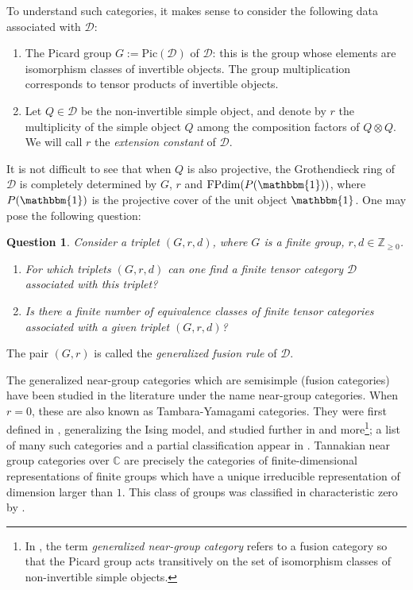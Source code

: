\documentclass{amsart}
\theoremstyle{plain}%
\newtheorem*{introquestion*}{Question}
\theoremstyle{remark}
\newcommand{\1}{\mathbbm{1}}
\newcommand{\D}{\mathcal{D}}
\newcommand{\Z}{\mathbb{Z}}
\newcommand{\FPdim}{\mathrm{FPdim}}
\newcommand{\pic}{\mathrm{Pic}}
\begin{document}
    To understand such categories, it makes sense to consider the following data associated with $\D$:
    \begin{enumerate}
        \item The Picard group $G:=\pic(\D)$ of $\D$: this is the group whose elements are isomorphism classes of invertible objects. The group multiplication corresponds to tensor products of invertible objects.
        \item Let $Q\in \D$ be the non-invertible simple  object, and denote by $r$ the multiplicity of the simple object $Q$ among the composition factors of $Q\otimes Q$. We will call $r$ the {\it extension constant} of $\D$.
    \end{enumerate}
    It is not difficult to see that when $Q$ is also projective, the Grothendieck ring of $\D$ is completely determined by $G$, $r$ and $\FPdim(P(\1))$, where $P(\1)$ is the projective cover of the unit object $\1$. One may pose the following question: 
    \begin{introquestion*}\label{ques:main}
        Consider a triplet $(G,r,d)$, where $G$ is a finite group, $r,d\in \Z_{\geq 0}$.
        \begin{enumerate}
            \item For which triplets $(G,r,d)$ can one find a finite tensor category $\D$ associated with this triplet? 
            \item Is there a finite number of equivalence classes of finite tensor categories associated with a given triplet $(G,r,d)$?
        \end{enumerate}
    \end{introquestion*}
The pair $(G, r)$ is called the {\it generalized fusion rule} of $\D$.

    The generalized near-group categories which are semisimple (fusion categories) have been studied in the literature under the name near-group categories. When $r=0$, these are also known as Tambara-Yamagami categories. They were first defined in \cite{TY}, generalizing the Ising model, and studied further in \cite{Si1, Si2, EG2, T2, T3, O, Iz} and more\footnote{In \cite{T3}, the term \textit{generalized near-group category} refers to a fusion category so that the Picard group acts transitively on the set of isomorphism classes of non-invertible simple objects.}; a list of many such categories and a partial classification appear in \cite{EG2}. Tannakian near group categories over $\mathbb{C}$ are precisely the categories of finite-dimensional representations of finite groups which have a unique irreducible representation of dimension larger than $1$. This class of groups was classified in characteristic zero by \cite{Sei}.%
\end{document}
